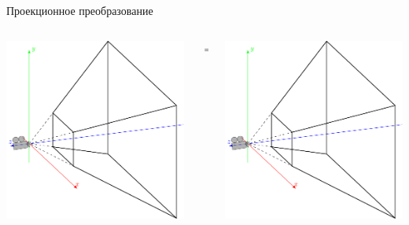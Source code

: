 \documentclass[10pt]{beamer}
\begin{document}
	
	\begin{frame}{Проекционное преобразование}
		
		\centering
		\begin{columns}
			\begin{column}{0.5\textwidth}
				\includegraphics[page=1,width=\textwidth]{cvv_empty.pdf}
			\end{column}
			
			\begin{column}{0.1\textwidth}
				$\Rightarrow$
			\end{column}
			
			
			\begin{column}{0.4\textwidth}
				\includegraphics[page=2,width=\textwidth]{cvv_empty.pdf}
			\end{column}
		\end{columns}
		

\end{frame}
\end{document}
